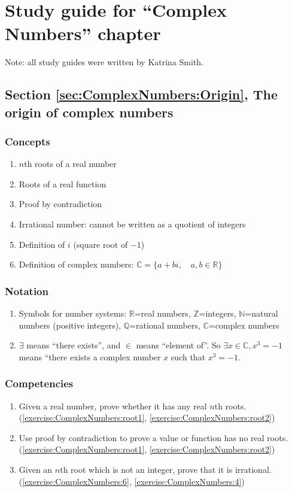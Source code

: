 \section{Study guide  for ``Complex Numbers''  chapter}
\label{sec:ComplexNumbers:StudyGuide} 

Note: all study guides were written by Katrina Smith.

\subsection*{Section \ref{sec:ComplexNumbers:Origin}, The origin of complex numbers}
\subsubsection*{Concepts}
\begin{enumerate}
\item 
$n$th roots of a real number
\item
Roots of a real function
\item
Proof by contradiction
\item
Irrational number: cannot be written as a quotient of integers
\item
Definition of $i$ (square root of $-1$)
\item
Definition of complex numbers:  $\mathbb{C}=\{a+bi, \quad a,b \in \mathbb{R} \}$
\end{enumerate}

\subsubsection*{Notation}
\begin{enumerate}
\item
Symbols for number systems: $\mathbb{R}$=real numbers, $\mathbb{Z}$=integers, $\mathbb{N}$=natural numbers (positive integers), $\mathbb{Q}$=rational numbers, $\mathbb{C}$=complex numbers
\item $\exists$ means ``there exists'',  and $\in$ means ``element of''. So $\exists x \in \mathbb{C}, x^3 = -1$ means ``there exists a complex number $x$ such that $x^3=-1$.
\end{enumerate}

\subsubsection*{Competencies}
\begin{enumerate}
\item
Given a real number, prove whether it has any real $n$th roots.  (\ref{exercise:ComplexNumbers:root1}, \ref{exercise:ComplexNumbers:root2}) 
\item
Use proof by contradiction to prove a value or function has no real roots. (\ref{exercise:ComplexNumbers:root1}, \ref{exercise:ComplexNumbers:root2})
\item	
Given an $n$th root which is not an integer, prove that it is irrational. (\ref{exercise:ComplexNumbers:6}, \ref{exercise:ComplexNumbers:4})
\end{enumerate}


